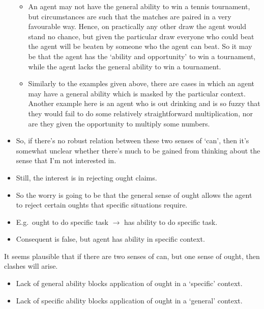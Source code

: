 \documentclass[10pt]{article}
\begin{document}
\begin{itemize}
\begin{itemize}
  \item An agent may not have the general ability to win a tennis tournament, but circumstances are such that the matches are paired in a very favourable way.
    Hence, on practically any other draw the agent would stand no chance, but given the particular draw everyone who could beat the agent will be beaten by someone who the agent can beat.
    So it may be that the agent has the `ability and opportunity' to win a tournament, while the agent lacks the general ability to win a tournament.
  \item Similarly to the examples given above, there are cases in which an agent may have a general ability which is masked by the particular context.
    Another example here is an agent who is out drinking and is so fuzzy that they would fail to do some relatively straightforward multiplication, nor are they given the opportunity to multiply some numbers.
  \end{itemize}
\item So, if there's no robust relation between these two senses of `can', then it's somewhat unclear whether there's much to be gained from thinking about the sense that I'm not interested in.
\end{itemize}

\begin{itemize}
\item Still, the interest is in rejecting ought claims.
\item So the worry is going to be that the general sense of ought allows the agent to reject certain oughts that specific situations require.
\item E.g.\ ought to do specific task \(\rightarrow\) has ability to do specific task.
\item Consequent is false, but agent has ability in specific context.
\end{itemize}

It seems plausible that if there are two senses of can, but one sense of ought, then clashes will arise.

\begin{itemize}
\item Lack of general ability blocks application of ought in a `specific' context.
\item Lack of specific ability blocks application of ought in a `general' context.
\end{itemize}
\end{document}

